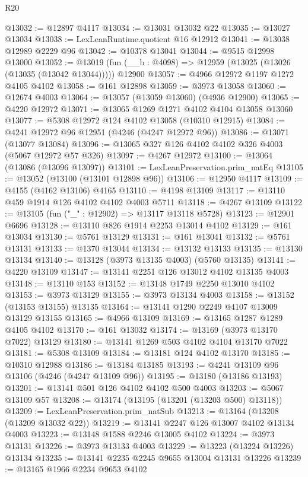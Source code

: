 \begin{lexlean}{R20}
\begin{coremodule}
@13032 := @12897 @4117
@13034 := @13031 @13032 @22
@13035 := @13027 @13034
@13038 := LexLeanRuntime.quotient @16 @12912
@13041 := @13038 @12989 @2229 @96
@13042 := @10378 @13041
@13044 := @9515 @12998 @13000
@13052 := @13019 (fun (__b : @4098) => @12959 (@13025 (@13026 (@13035 (@13042 @13044))))) @12900
@13057 := @4966 @12972 @1197 @1272 @4105 @4102
@13058 := @161 @12898
@13059 := @3973 @13058
@13060 := @12674 @4003
@13064 := @13057 (@13059 @13060) (@4936 @12900)
@13065 := @4220 @12972
@13071 := @13065 @1269 @1271 @4102 @4104 @13058 @13060
@13077 := @5308 @12972 @124 @4102 @13058 (@10310 @12915)
@13084 := @4241 @12972 @96 @12951 (@4246 (@4247 @12972 @96))
@13086 := @13071 (@13077 @13084)
@13096 := @13065 @327 @126 @4102 @4102 @326 @4003 (@5067 @12972 @57 @326)
@13097 := @4267 @12972
@13100 := @13064 (@13086 (@13096 @13097))
@13101 := LexLeanPreservation.prim_natEq
@13105 := @13052 (@13100 (@13101 @12898 @96))
@13106 := @12950 @4117
@13109 := @4155 (@4162 @13106) @4165
@13110 := @4198 @13109
@13117 := @13110 @459 @1914 @126 @4102 @4102 @4003 @5711
@13118 := @4267 @13109
@13122 := @13105 (fun ("_" : @12902) => @13117 @13118 @5728)
@13123 := @12901 @6696
@13128 := @13110 @826 @1914 @2253 @13014 @4102
@13129 := @161 @13034
@13130 := @5761 @13129
@13131 := @161 @13041
@13132 := @5761 @13131
@13133 := @1370 @13044
@13134 := @13132 @13133
@13135 := @13130 @13134
@13140 := @13128 (@3973 @13135 @4003) (@5760 @13135)
@13141 := @4220 @13109
@13147 := @13141 @2251 @126 @13012 @4102 @13135 @4003
@13148 := @13110 @153
@13152 := @13148 @1749 @2250 @13010 @4102
@13153 := @3973 @13129
@13155 := @3973 @13134 @4003
@13158 := @13152 (@13153 @13155) @13135
@13164 := @13141 @1290 @2249 @4107 @13009 @13129 @13155
@13165 := @4966 @13109
@13169 := @13165 @1287 @1289 @4105 @4102
@13170 := @161 @13032
@13174 := @13169 (@3973 @13170 @7022) @13129
@13180 := @13141 @1269 @503 @4102 @4104 @13170 @7022
@13181 := @5308 @13109
@13184 := @13181 @124 @4102 @13170
@13185 := @10310 @12988
@13186 := @13184 @13185
@13193 := @4241 @13109 @96 @13106 (@4246 (@4247 @13109 @96))
@13195 := @13180 (@13186 @13193)
@13201 := @13141 @501 @126 @4102 @4102 @500 @4003
@13203 := @5067 @13109 @57
@13208 := @13174 (@13195 (@13201 (@13203 @500) @13118))
@13209 := LexLeanPreservation.prim_natSub
@13213 := @13164 (@13208 (@13209 @13032 @22))
@13219 := @13141 @2247 @126 @13007 @4102 @13134 @4003
@13223 := @13148 @1588 @2246 @13005 @4102
@13224 := @3973 @13131
@13226 := @3973 @13133 @4003
@13229 := @13223 (@13224 @13226) @13134
@13235 := @13141 @2235 @2245 @9655 @13004 @13131 @13226
@13239 := @13165 @1966 @2234 @9653 @4102

\end{coremodule}
\end{lexlean}
